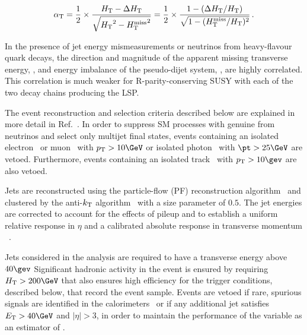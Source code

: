 \begin{equation}
  \label{eq:alphat}
  \alphat = \frac{1}{2} \times \frac{\scalht -
    \dht}{\sqrt{\scalht^2 - \mht^2}}  = \frac{1}{2} \times
  \frac{1 - (\dht/\scalht)}{\sqrt{1 - (\mht/\scalht)^2}}\,. \nonumber
\end{equation}

In the presence of jet energy mismeasurements or neutrinos from
heavy-flavour quark decays, the direction and magnitude of the
apparent missing transverse energy, \mht, and energy imbalance of the
pseudo-dijet system, \dht, are highly correlated. This correlation is
much weaker for R-parity-conserving SUSY with each of the two decay
chains producing the LSP.

The event reconstruction and selection criteria described below are
explained in more detail in Ref.~\cite{RA1Paper2012}.
In order to suppress SM processes with genuine \met from neutrinos and
select only multijet final states, events containing an isolated
electron~\cite{PAS-EGM-10-004} or muon~\cite{PAS-MUO-10-004} with $\Pt
> 10\GeV$ or isolated photon~\cite{PAS-EGM-10-006} with $\pt > 25\GeV$
are vetoed. Furthermore, events containing an isolated
track~\cite{single-lepton-stop} with $\Pt > 10\gev$ are also vetoed.

Jets are reconstructed using the particle-flow (PF) reconstruction
algorithm~\cite{CMS-PAS-PFT-09-001, CMS-PAS-PFT-10-001} and 
clustered by the anti-$k_{\rm T}$ algorithm~\cite{antikt} with
a size parameter of $0.5$. The jet energies %
are corrected to account for the effects of pileup
and to establish a uniform relative response in $\eta$ and a
calibrated absolute response in transverse momentum
\pt~\cite{2011arXiv1107.4277C}.

Jets considered in the analysis are required to have a transverse
energy above $40\gev$ %
Significant hadronic activity
in the event is ensured by requiring $\scalht > 200\GeV$ that also
ensures high efficiency for the trigger conditions, described below,
that record the event sample.
%
Events are vetoed if rare, spurious signals are identified in the
calorimeters~\cite{1748-0221-5-03-T03014, CMS-NOTE-2010-012} or if any
additional jet satisfies $\Et > 40\GeV$ and $|\eta| > 3$, in order to
maintain the performance of the variable \mht as an estimator of \met.

